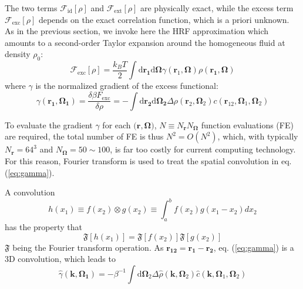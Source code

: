 The two terms $\mathcal{F}_{\mathrm{id}}[\rho]$ and $\mathcal{F}_{\mathrm{ext}}[\rho]$
are physically exact, while the excess term $\mathcal{F}_{\mathrm{exc}}[\rho]$
depends on the exact correlation function, which is a priori unknown.
As in the previous section, we invoke here the \acs{HRF} approximation
which amounts to a second-order Taylor expansion around the homogeneous
fluid at density $\rho_{0}$:
\begin{equation}
\mathcal{F}_{\mathrm{exc}}[\rho]=\frac{k_{B}T}{2}\int\mathrm{d}\mathbf{r_{1}}\mathrm{d}\mathbf{\mathbf{\Omega}}\gamma(\mathbf{r}_{1},\mathbf{\mathbf{\mathbf{\mathbf{\Omega}}}})\rho(\mathbf{r_{1}},\mathbf{\mathbf{\mathbf{\mathbf{\Omega}}}})\label{eq:fexc}
\end{equation}
where $\gamma$ is the normalized gradient of the excess functional:
\begin{equation}
\gamma(\mathbf{r_{1}},\mathbf{\Omega_{1}})=\frac{\delta\beta F_{\mathrm{exc}}}{\delta\rho}=-\int\mathrm{d}\mathbf{r_{2}}\mathrm{d}\mathbf{\Omega_{2}}\Delta\rho(\mathbf{r}_{2},\mathbf{\Omega}_{2})c(\mathbf{r}_{12},\mathbf{\Omega}_{1},\mathbf{\Omega}_{2})\label{eq:gamma}
\end{equation}

To evaluate the gradient $\gamma$ for each $\mathbf{(r},\mathbf{\Omega})$,
$N\equiv N_{\mathbf{r}}N_{\mathbf{\Omega}}$ function evaluations
(\acs{FE}) are required, the total number of \acs{FE} is thus $N^{2}=O(N^{2})$,
which, with typically $N_{\mathbf{r}}=64^{3}$ and $N_{\mathbf{\Omega}}=50\sim100$,
is far too costly for current computing technology. For this reason,
Fourier transform is used to treat the spatial convolution in eq.
(\ref{eq:gamma}).

A convolution
\begin{equation}
h(x_{1})\equiv f(x_{2})\otimes g(x_{2})\equiv\int_{a}^{b}f(x_{2})g(x_{1}-x_{2})dx_{2}\label{eq:convolution-1}
\end{equation}
has the property that
\begin{equation}
\mathfrak{F}[h(x_{1})]=\mathfrak{F}[f(x_{2})]\mathfrak{F}[g(x_{2})]\label{eq:convolution-2}
\end{equation}
$\mathfrak{F}$ being the Fourier transform operation. As $\mathbf{r_{12}}=\mathbf{r_{1}}-\mathbf{r_{2}}$,
eq. (\ref{eq:gamma}) is a 3D convolution, which leads to
\begin{equation}
\hat{\gamma}(\mathbf{k},\mathbf{\Omega_{1}})=-\beta^{-1}\int\mathrm{d}\mathbf{\Omega}_{2}\Delta\hat{\rho}(\mathbf{k},\mathbf{\Omega}_{2})\hat{c}(\mathbf{k},\mathbf{\Omega}_{1},\mathbf{\Omega}_{2})\label{eq:gamma-k}
\end{equation}

